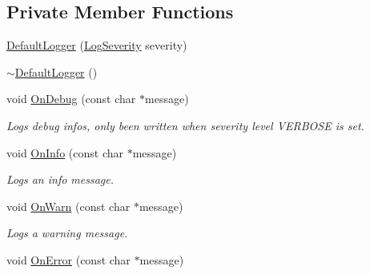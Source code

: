 \subsection*{Private Member Functions}
\begin{DoxyCompactItemize}
\item 
\hyperlink{class_assimp_1_1_default_logger_ac89e8018f7e97327a6b91abbe36178e1}{Default\+Logger} (\hyperlink{class_assimp_1_1_logger_a8b6248a0fd062431e8572556350d29e6}{Log\+Severity} severity)
\item 
\hyperlink{class_assimp_1_1_default_logger_ac3901fa0196c0bab25f301f471cc9b74}{$\sim$\+Default\+Logger} ()
\item 
void \hyperlink{class_assimp_1_1_default_logger_abcdc5564407fcda65b114a80969c42fa}{On\+Debug} (const char $\ast$message)\hypertarget{class_assimp_1_1_default_logger_abcdc5564407fcda65b114a80969c42fa}{}\label{class_assimp_1_1_default_logger_abcdc5564407fcda65b114a80969c42fa}

\begin{DoxyCompactList}\small\item\em Logs debug infos, only been written when severity level V\+E\+R\+B\+O\+SE is set. \end{DoxyCompactList}\item 
void \hyperlink{class_assimp_1_1_default_logger_a068f81f1daacd12c3b5cf9f12089b789}{On\+Info} (const char $\ast$message)\hypertarget{class_assimp_1_1_default_logger_a068f81f1daacd12c3b5cf9f12089b789}{}\label{class_assimp_1_1_default_logger_a068f81f1daacd12c3b5cf9f12089b789}

\begin{DoxyCompactList}\small\item\em Logs an info message. \end{DoxyCompactList}\item 
void \hyperlink{class_assimp_1_1_default_logger_a8de943d7b5bf39c5ae81a2a56313e4be}{On\+Warn} (const char $\ast$message)\hypertarget{class_assimp_1_1_default_logger_a8de943d7b5bf39c5ae81a2a56313e4be}{}\label{class_assimp_1_1_default_logger_a8de943d7b5bf39c5ae81a2a56313e4be}

\begin{DoxyCompactList}\small\item\em Logs a warning message. \end{DoxyCompactList}\item 
void \hyperlink{class_assimp_1_1_default_logger_a32caf08bb38ecbc53b0f75fd983ef5ae}{On\+Error} (const char $\ast$message)\hypertarget{class_assimp_1_1_default_logger_a32caf08bb38ecbc53b0f75fd983ef5ae}{}\label{class_assimp_1_1_default_logger_a32caf08bb38ecbc53b0f75fd983ef5ae}


\end{DoxyCompactItemize}

